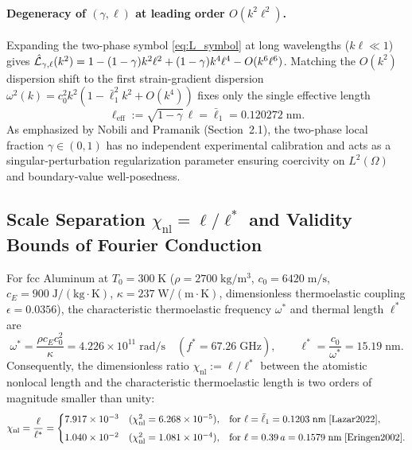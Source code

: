 \paragraph{Degeneracy of $(\gamma,\ell)$ at leading order $O(k^2\ell^2)$.}
Expanding the two-phase symbol \eqref{eq:L_symbol} at long wavelengths ($k\ell \ll 1$) gives $\hat{\mathcal{L}}_{\gamma,\ell}(k^2) = 1 - (1-\gamma)k^2\ell^2 + (1-\gamma)k^4\ell^4 - O(k^6\ell^6)$. Matching the $O(k^2)$ dispersion shift to the first strain-gradient dispersion $\omega^2(k) = c_0^2 k^2(1 - \bar{\ell}_1^2 k^2 + O(k^4))$ fixes only the single effective length
\begin{equation}\label{eq:ell_eff}
  \ell_{\mathrm{eff}} := \sqrt{1-\gamma}\,\ell = \bar{\ell}_1 = 0.120272\;\mathrm{nm}.
\end{equation}
As emphasized by Nobili and Pramanik \cite{NobiliPramanik2025b} (Section~2.1), the two-phase local fraction $\gamma \in (0,1)$ has no independent experimental calibration and acts as a singular-perturbation regularization parameter ensuring coercivity on $L^2(\Omega)$ and boundary-value well-posedness.

\subsection{Scale Separation $\chi_{\mathrm{nl}} = \ell/\ell^*$ and Validity Bounds of Fourier Conduction}\label{subsec:scale_separation}

For fcc Aluminum at $T_0 = 300\;\mathrm{K}$ ($\rho = 2700\;\mathrm{kg/m^3}$, $c_0 = 6420\;\mathrm{m/s}$, $c_E = 900\;\mathrm{J/(kg\cdot K)}$, $\kappa = 237\;\mathrm{W/(m\cdot K)}$, dimensionless thermoelastic coupling $\epsilon = 0.0356$), the characteristic thermoelastic frequency $\omega^*$ and thermal length $\ell^*$ are
\begin{equation}\label{eq:al_thermal_scales}
  \omega^* = \frac{\rho c_E c_0^2}{\kappa} = 4.226 \times 10^{11}\;\mathrm{rad/s} \quad (f^* = 67.26\;\mathrm{GHz}), \qquad
  \ell^* = \frac{c_0}{\omega^*} = 15.19\;\mathrm{nm}.
\end{equation}
Consequently, the dimensionless ratio $\chi_{\mathrm{nl}} := \ell/\ell^*$ between the atomistic nonlocal length and the characteristic thermoelastic length is two orders of magnitude smaller than unity:
\begin{equation}\label{eq:chi_nl_values}
  \chi_{\mathrm{nl}} = \frac{\ell}{\ell^*} = \begin{cases}
    7.917 \times 10^{-3} \quad (\chi_{\mathrm{nl}}^2 = 6.268 \times 10^{-5}), & \text{for } \ell = \bar{\ell}_1 = 0.1203\;\mathrm{nm} \;\text{\cite{Lazar2022}}, \\[4pt]
    1.040 \times 10^{-2} \quad (\chi_{\mathrm{nl}}^2 = 1.081 \times 10^{-4}), & \text{for } \ell = 0.39\,a = 0.1579\;\mathrm{nm} \;\text{\cite{Eringen2002}}.
  \end{cases}
\end{equation}

